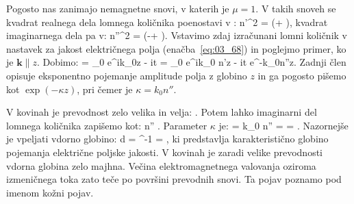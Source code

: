 \label{eq:03_79}
\eeq
Pogosto nas zanimajo nemagnetne snovi, v katerih je $\mu=1$. V takih
snoveh se kvadrat realnega dela lomnega količnika poenostavi v :
\beq
n'^2 = \left(\varepsilon + \right)\!\!,
\label{eq:03_80}
\eeq
kvadrat imaginarnega dela pa v:
\beq
n''^2 = \left(-\varepsilon + \right)\!\!.
\label{eq:03_81}
\eeq
Vstavimo zdaj izračunani lomni količnik v nastavek za jakost električnega polja 
(enačba~\ref{eq:03_68}) in poglejmo
primer, ko je $\mathbf{k} \parallel z$. Dobimo:
\beq
{} = _0 e^{ik_0z - i\omega t} = 
_0 e^{ik_0 n'z - i\omega t} \cdot e^{-k_0n''z}.
\label{eq:03_82}
\eeq
Zadnji člen opisuje eksponentno pojemanje amplitude polja z globino $z$ in ga pogosto
pišemo kot $\exp(-\kappa z)$, pri čemer je $\kappa = k_0 n''$.

V kovinah je prevodnost zelo velika in velja:
\beq
{} \gg \varepsilon.
\label{eq:03_83}
\eeq
Potem lahko imaginarni del lomnega količnika zapišemo kot:
\beq
n'' \approx {}.
\label{eq:03_84}
\eeq
Parameter $\kappa$ je:
\beq
\kappa = k_0 n'' =   = .
\label{eq:03_85}
\eeq
Nazornejše je vpeljati vdorno globino:
\beq
d = \kappa^{-1} = ,
\label{eq:03_86}
\eeq
ki predstavlja karakteristično globino pojemanja električne poljske jakosti.
V kovinah je zaradi velike prevodnosti vdorna globina zelo majhna. Večina elektromagnetnega
valovanja oziroma izmeničnega toka zato teče po površini prevodnih snovi. Ta pojav poznamo pod imenom
kožni pojav.

